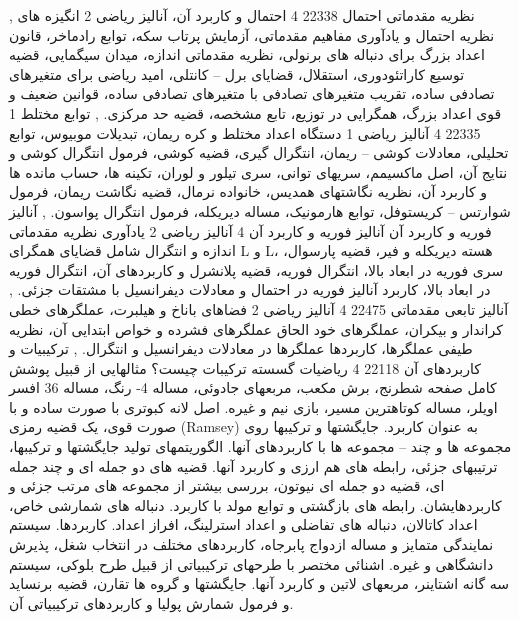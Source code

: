 \documentclass[class=article, crop=false]{standalone}
\begin{document}
{{{{        }}
        },{{
            نظریه مقدماتی احتمال
        }{
            22338
        }{
            4
        }{
            احتمال و کاربرد آن، آنالیز ریاضی 2
        }{}{{
            انگیزه های نظریه احتمال و یادآوری مفاهیم مقدماتی، آزمایش پرتاب سکه، توابع رادماخر، قانون اعداد بزرگ برای دنباله های برنولی، نظریه مقدماتی اندازه، میدان سیگمایی، قضیه توسیع کاراتئودوری، استقلال، قضایای برل – کانتلی، امید ریاضی برای متغیرهای تصادفی ساده، تقریب متغیرهای تصادفی با متغیرهای تصادفی ساده، قوانین ضعیف و قوی اعداد بزرگ، همگرایی در توزیع، تابع مشخصه، قضیه حد مرکزی.
        }}
        },{{
            توابع مختلط 1
        }{
            22335
        }{
            4
        }{
            آنالیز ریاضی 1
        }{}{{
            دستگاه اعداد مختلط و کره ریمان، تبدیلات موبیوس، توابع تحلیلی، معادلات کوشی – ریمان، انتگرال گیری، قضیه کوشی، فرمول انتگرال کوشی و نتایج آن، اصل ماکسیمم، سریهای توانی، سری تیلور و لوران، تکینه ها، حساب مانده ها و کاربرد آن، نظریه نگاشتهای همدیس، خانواده نرمال، قضیه نگاشت ریمان، فرمول شوارتس – کریستوفل، توابع هارمونیک، مساله دیریکله، فرمول انتگرال پواسون.
        }}
        },{{
            آنالیز فوریه و کاربرد آن
        }{
            آنالیز فوریه و کاربرد آن
        }{
            4
        }{
            آنالیز ریاضی 2
        }{}{{
            یادآوری نظریه مقدماتی اندازه و انتگرال شامل قضایای همگرای L و L، هسته دیریکله و فیر، قضیه پارسوال، سری فوریه در ابعاد بالا، انتگرال فوریه، قضیه پلانشرل و کاربردهای آن، انتگرال فوریه در ابعاد بالا، کاربرد آنالیز فوریه در احتمال و معادلات دیفرانسیل با مشتقات جزئی.
        }}
        },{{
            آنالیز تابعی مقدماتی
        }{
            22475
        }{
            4
        }{
            آنالیز ریاضی 2
        }{}{{
            فضاهای باناخ و هیلبرت، عملگرهای خطی کراندار و بیکران، عملگرهای خود الحاق عملگرهای فشرده و خواص ابتدایی آن، نظریه طیفی عملگرها، کاربردها عملگرها در معادلات دیفرانسیل و انتگرال.
        }}
        },{{
            ترکیبیات و کاربردهای آن
        }{
            22118
        }{
            4
        }{
            ریاضیات گسسته
        }{}{{
            ترکیبات چیست؟ مثالهایی از قبیل پوشش کامل صفحه شطرنج، برش مکعب، مربعهای جادوئی، مساله 4- رنگ، مساله 36 افسر اویلر، مساله کوتاهترین مسیر، بازی نیم و غیره. اصل لانه کبوتری با صورت ساده و با صورت قوی، یک قضیه رمزی (Ramsey) به عنوان کاربرد. جایگشتها و ترکیبها روی مجموعه ها و چند – مجموعه ها با کاربردهای آنها. الگوریتمهای تولید جایگشتها و ترکیبها، ترتیبهای جزئی، رابطه های هم ارزی و کاربرد آنها. قضیه های دو جمله ای و چند جمله ای، قضیه دو جمله ای نیوتون، بررسی بیشتر از مجموعه های مرتب جزئی و کاربردهایشان. رابطه های بازگشتی و توابع مولد با کاربرد. دنباله های شمارشی خاص، اعداد کاتالان، دنباله های تفاضلی و اعداد استرلینگ، افراز اعداد. کاربردها. سیستم نمایندگی متمایز و مساله ازدواج پابرجاه، کاربردهای مختلف در انتخاب شغل، پذیرش دانشگاهی و غیره. اشنائی مختصر با طرحهای ترکیبیاتی از قبیل طرح بلوکی، سیستم سه گانه اشتاینر، مربعهای لاتین و کاربرد آنها. جایگشتها و گروه ها تقارن، قضیه برنساید و فرمول شمارش پولیا و کاربردهای ترکیبیاتی آن.
}}}}
\end{document}
